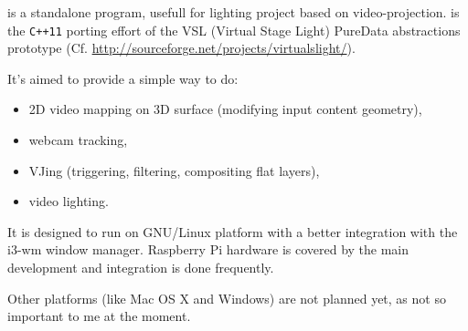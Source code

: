 \vilain{} is a standalone program, usefull for lighting project based
on video-projection. \vilain{} is the \texttt{C++11} porting effort of
the VSL (Virtual Stage Light) PureData abstractions prototype
(Cf. \url{http://sourceforge.net/projects/virtualslight/}).

It's aimed to provide a simple way to do:
\begin{itemize}
    \item 2D video mapping on 3D surface (modifying input content
    geometry),
    \item webcam tracking,
    \item VJing (triggering, filtering, compositing flat layers),
    \item video lighting.
\end{itemize}

It is designed to run on GNU/Linux platform with a better integration
with the i3-wm window manager. Raspberry Pi hardware is covered by the
main development and integration is done frequently.

Other platforms (like Mac OS X and Windows) are not planned yet, as not so
important to me at the moment.
